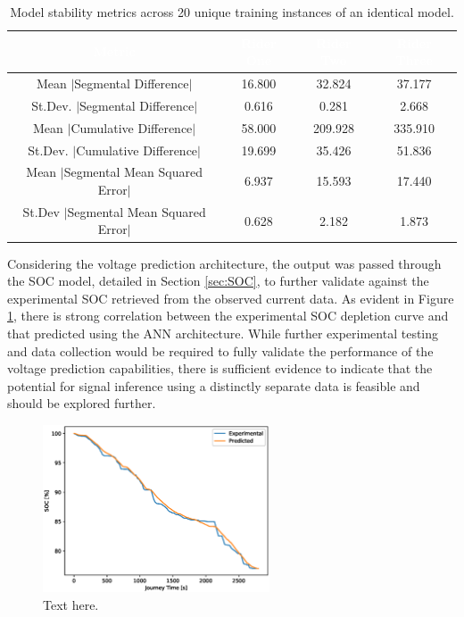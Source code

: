 \documentclass[a4paper, 10pt]{article}
\numberwithin{equation}{section}
\begin{document}
\begin{table}[h!]
    \centering
    \small
    \caption{Model stability metrics across 20 unique training instances of an identical model.}
    \begin{tabular}{|c||c|c|c|}
        \cellcolor{gray!120}\textcolor{white}{\textbf{Metric}} & \cellcolor{gray!120}\textcolor{white}{\textbf{Rider One}} & \cellcolor{gray!120}\textcolor{white}{\textbf{Rider Two}}& \cellcolor{gray!120}\textcolor{white}{\textbf{Rider Three}}\\
        \hline
        \hline
        Mean $\mid$Segmental Difference$\mid$ & 16.800 & 32.824 & 37.177 \\
        St.Dev. $\mid$Segmental Difference$\mid$ & 0.616 & 0.281 & 2.668 \\
        \hline
        Mean $\mid$Cumulative Difference$\mid$ & 58.000 & 209.928 & 335.910 \\
        St.Dev. $\mid$Cumulative Difference$\mid$ & 19.699 & 35.426 & 51.836 \\
        \hline
        Mean $\mid$Segmental Mean Squared Error$\mid$ & 6.937 & 15.593 & 17.440 \\
        St.Dev $\mid$Segmental Mean Squared Error$\mid$ & 0.628 & 2.182 & 1.873 \\
        \hline
    \end{tabular}
    \label{tab:nn:time_mean_std}
\end{table}

Considering the voltage prediction architecture, the output was passed through the SOC model, detailed in Section \ref{sec:SOC}, to further validate against the experimental SOC retrieved from the observed current data. As evident in Figure \ref{fig:nn:soc_ML}, there is strong correlation between the experimental SOC depletion curve and that predicted using the ANN architecture. While further experimental testing and data collection would be required to fully validate the performance of the voltage prediction capabilities, there is sufficient evidence to indicate that the potential for signal inference using a distinctly separate data is feasible and should be explored further.

 \begin{figure}[h!]
    \centering
    \includegraphics[width=0.6\textwidth]{images/NN_ANN/soc_ML.eps}
    \caption{Text here.}
    \label{fig:nn:soc_ML}
\end{figure}
\end{document}
